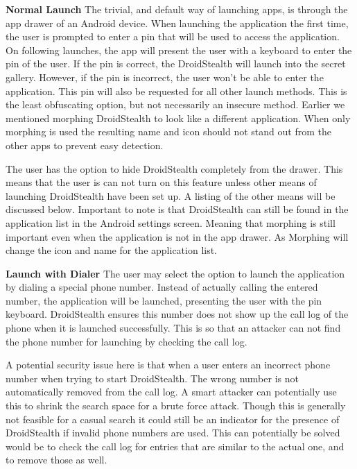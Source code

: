 \textbf{Normal Launch}
The trivial, and default way of launching apps, is through the app drawer of an Android device. 
When launching the application the first time, the user is prompted to enter a pin that will be used to access the application.
On following launches, the app will present the user with a keyboard to enter the pin of the user. 
If the pin is correct, the DroidStealth will launch into the secret gallery.
However, if the pin is incorrect, the user won't be able to enter the application.
This pin will also be requested for all other launch methods. %
This is the least obfuscating option, but not necessarily an insecure method.
Earlier we mentioned morphing DroidStealth to look like a different application.
When only morphing is used the resulting name and icon should not stand out from the other apps to prevent easy detection.

The user has the option to hide DroidStealth completely from the drawer. 
This means that the user is can  not turn on this feature unless other means of launching DroidStealth have been set up.
A listing of the other means will be discussed below.  %
Important to note is that DroidStealth can still be found in the application list in the Android settings screen.
Meaning that morphing is still important even when the application is not in the app drawer.
As Morphing will change the icon and name for the application list.

\textbf{Launch with Dialer}
The user may select the option to launch the application by dialing a special phone number. 
Instead of actually calling the entered number, the application will be launched, presenting the user with the pin keyboard. 
DroidStealth ensures this number does not show up the call log of the phone when it is launched successfully.
This is so that an attacker can not find the phone number for launching by checking the call log.

A potential security issue here is that when a user enters an incorrect phone number when trying to start DroidStealth.
The wrong number is not automatically removed from the call log. 
A smart attacker can potentially use this to shrink the search space for a brute force attack.
Though this is generally not feasible for a casual search it could still be an indicator for the presence of DroidStealth if invalid phone numbers are used.
This can potentially be solved would be to check the call log for entries that are similar to the actual one, and to remove those as well.

